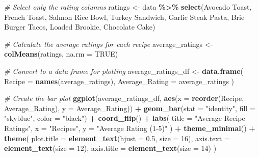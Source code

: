 \documentclass[
]{book}
\newenvironment{Shaded}{\begin{snugshade}}{\end{snugshade}}
\newcommand{\AttributeTok}[1]{\textcolor[rgb]{0.13,0.29,0.53}{#1}}
\newcommand{\CommentTok}[1]{\textcolor[rgb]{0.56,0.35,0.01}{\textit{#1}}}
\newcommand{\ConstantTok}[1]{\textcolor[rgb]{0.56,0.35,0.01}{#1}}
\newcommand{\DecValTok}[1]{\textcolor[rgb]{0.00,0.00,0.81}{#1}}
\newcommand{\FloatTok}[1]{\textcolor[rgb]{0.00,0.00,0.81}{#1}}
\newcommand{\FunctionTok}[1]{\textcolor[rgb]{0.13,0.29,0.53}{\textbf{#1}}}
\newcommand{\NormalTok}[1]{#1}
\newcommand{\OtherTok}[1]{\textcolor[rgb]{0.56,0.35,0.01}{#1}}
\newcommand{\SpecialCharTok}[1]{\textcolor[rgb]{0.81,0.36,0.00}{\textbf{#1}}}
\newcommand{\StringTok}[1]{\textcolor[rgb]{0.31,0.60,0.02}{#1}}
\begin{document}
\begin{Shaded}
\begin{Highlighting}[]
\CommentTok{\# Select only the rating columns}
\NormalTok{ratings }\OtherTok{\textless{}{-}}\NormalTok{ data }\SpecialCharTok{\%\textgreater{}\%}
  \FunctionTok{select}\NormalTok{(}\StringTok{\textasciigrave{}}\AttributeTok{Avocado Toast}\StringTok{\textasciigrave{}}\NormalTok{, }\StringTok{\textasciigrave{}}\AttributeTok{French Toast}\StringTok{\textasciigrave{}}\NormalTok{, }\StringTok{\textasciigrave{}}\AttributeTok{Salmon Rice Bowl}\StringTok{\textasciigrave{}}\NormalTok{, }
         \StringTok{\textasciigrave{}}\AttributeTok{Turkey Sandwich}\StringTok{\textasciigrave{}}\NormalTok{, }\StringTok{\textasciigrave{}}\AttributeTok{Garlic Steak Pasta}\StringTok{\textasciigrave{}}\NormalTok{, }
         \StringTok{\textasciigrave{}}\AttributeTok{Brie Burger Tacos}\StringTok{\textasciigrave{}}\NormalTok{, }\StringTok{\textasciigrave{}}\AttributeTok{Loaded Brookie}\StringTok{\textasciigrave{}}\NormalTok{, }\StringTok{\textasciigrave{}}\AttributeTok{Chocolate Cake}\StringTok{\textasciigrave{}}\NormalTok{)}

\CommentTok{\# Calculate the average ratings for each recipe}
\NormalTok{average\_ratings }\OtherTok{\textless{}{-}} \FunctionTok{colMeans}\NormalTok{(ratings, }\AttributeTok{na.rm =} \ConstantTok{TRUE}\NormalTok{)}

\CommentTok{\# Convert to a data frame for plotting}
\NormalTok{average\_ratings\_df }\OtherTok{\textless{}{-}} \FunctionTok{data.frame}\NormalTok{(}
  \AttributeTok{Recipe =} \FunctionTok{names}\NormalTok{(average\_ratings),}
  \AttributeTok{Average\_Rating =}\NormalTok{ average\_ratings}
\NormalTok{)}

\CommentTok{\# Create the bar plot}
\FunctionTok{ggplot}\NormalTok{(average\_ratings\_df, }\FunctionTok{aes}\NormalTok{(}\AttributeTok{x =} \FunctionTok{reorder}\NormalTok{(Recipe, Average\_Rating), }\AttributeTok{y =}\NormalTok{ Average\_Rating)) }\SpecialCharTok{+}
  \FunctionTok{geom\_bar}\NormalTok{(}\AttributeTok{stat =} \StringTok{"identity"}\NormalTok{, }\AttributeTok{fill =} \StringTok{"skyblue"}\NormalTok{, }\AttributeTok{color =} \StringTok{"black"}\NormalTok{) }\SpecialCharTok{+}
  \FunctionTok{coord\_flip}\NormalTok{() }\SpecialCharTok{+}
  \FunctionTok{labs}\NormalTok{(}
    \AttributeTok{title =} \StringTok{"Average Recipe Ratings"}\NormalTok{,}
    \AttributeTok{x =} \StringTok{"Recipes"}\NormalTok{,}
    \AttributeTok{y =} \StringTok{"Average Rating (1{-}5)"}
\NormalTok{  ) }\SpecialCharTok{+}
  \FunctionTok{theme\_minimal}\NormalTok{() }\SpecialCharTok{+}
  \FunctionTok{theme}\NormalTok{(}
    \AttributeTok{plot.title =} \FunctionTok{element\_text}\NormalTok{(}\AttributeTok{hjust =} \FloatTok{0.5}\NormalTok{, }\AttributeTok{size =} \DecValTok{16}\NormalTok{),}
    \AttributeTok{axis.text =} \FunctionTok{element\_text}\NormalTok{(}\AttributeTok{size =} \DecValTok{12}\NormalTok{),}
    \AttributeTok{axis.title =} \FunctionTok{element\_text}\NormalTok{(}\AttributeTok{size =} \DecValTok{14}\NormalTok{)}
\NormalTok{  )}
\end{Highlighting}
\end{Shaded}
\end{document}
